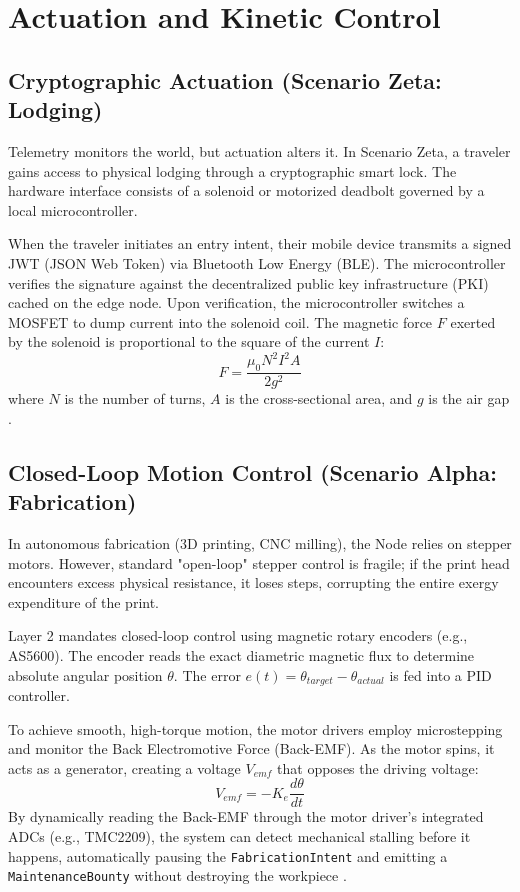 \chapter{Actuation and Kinetic Control}

\section{Cryptographic Actuation (Scenario Zeta: Lodging)}
Telemetry monitors the world, but actuation alters it. In Scenario Zeta, a traveler gains access to physical lodging through a cryptographic smart lock. The hardware interface consists of a solenoid or motorized deadbolt governed by a local microcontroller.

When the traveler initiates an entry intent, their mobile device transmits a signed JWT (JSON Web Token) via Bluetooth Low Energy (BLE). The microcontroller verifies the signature against the decentralized public key infrastructure (PKI) cached on the edge node. Upon verification, the microcontroller switches a MOSFET to dump current into the solenoid coil. The magnetic force $F$ exerted by the solenoid is proportional to the square of the current $I$:
\begin{equation}
F = \frac{\mu_0 N^2 I^2 A}{2g^2}
\end{equation}
where $N$ is the number of turns, $A$ is the cross-sectional area, and $g$ is the air gap \cite{griffiths2005introduction}. 

\section{Closed-Loop Motion Control (Scenario Alpha: Fabrication)}
In autonomous fabrication (3D printing, CNC milling), the Node relies on stepper motors. However, standard "open-loop" stepper control is fragile; if the print head encounters excess physical resistance, it loses steps, corrupting the entire exergy expenditure of the print.

Layer 2 mandates closed-loop control using magnetic rotary encoders (e.g., AS5600). The encoder reads the exact diametric magnetic flux to determine absolute angular position $\theta$. The error $e(t) = \theta_{target} - \theta_{actual}$ is fed into a PID controller. 

To achieve smooth, high-torque motion, the motor drivers employ microstepping and monitor the Back Electromotive Force (Back-EMF). As the motor spins, it acts as a generator, creating a voltage $V_{emf}$ that opposes the driving voltage:
\begin{equation}
V_{emf} = -K_e \frac{d\theta}{dt}
\end{equation}
By dynamically reading the Back-EMF through the motor driver's integrated ADCs (e.g., TMC2209), the system can detect mechanical stalling before it happens, automatically pausing the \texttt{FabricationIntent} and emitting a \texttt{MaintenanceBounty} without destroying the workpiece \cite{hughes2019electric}.

